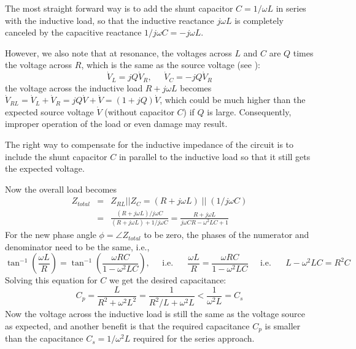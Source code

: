 The most straight forward way is to add the shunt capacitor 
$C=1/\omega L$ in series with the inductive load, so that the 
inductive reactance $j\omega L$ is completely canceled by the 
capacitive reactance $1/j\omega C=-j\omega L$.


However, we also note that at resonance, the voltages across $L$ and 
$C$ are $Q$ times the voltage across $R$, which is the same as the 
source voltage (see ):
\[
\dot{V}_L=jQ\dot{V}_R,\;\;\;\;\;\dot{V}_C=-jQ\dot{V}_R
\]
the voltage across the inductive load $R+j\omega L$ becomes 
$\dot{V}_{RL}=\dot{V}_L+\dot{V}_R=jQ\dot{V}+\dot{V}=(1+jQ)\dot{V}$, 
which could be much higher than the expected source voltage $\dot{V}$ 
(without capacitor $C$) if $Q$ is large. Consequently, improper 
operation of the load or even damage may result.

The right way to compensate for the inductive impedance of the circuit
is to include the shunt capacitor $C$ in parallel to the inductive load 
so that it still gets the expected voltage.


Now the overall load becomes 
\begin{eqnarray}
  Z_{total}&=&Z_{RL}||Z_C=(R+j\omega L)\; || \;(1/j\omega C)
  \nonumber\\
  &=&\frac{(R+j\omega L)/j\omega C}{(R+j\omega L)+1/j\omega C}
  =\frac{R+j\omega L}{j\omega CR-\omega^2 LC+1}	
  \nonumber
\end{eqnarray}
For the new phase angle $\phi=\angle Z_{total}$ to be zero, the phases 
of the numerator and denominator need to be the same, i.e.,
\[
\tan^{-1}\left(\frac{\omega L}{R}\right)
=\tan^{-1}\left(\frac{\omega RC}{1-\omega^2 LC}\right),
\;\;\;\;\;\mbox{i.e.}\;\;\;\;\;\;
\frac{\omega L}{R}=\frac{\omega RC}{1-\omega^2 LC}	
\;\;\;\;\;\mbox{i.e.}\;\;\;\;\;\;
L-\omega^2 LC=R^2C
\]
Solving this equation for $C$ we get the desired capacitance:
\[
C_p=\frac{L}{R^2+\omega^2 L^2} =\frac{1}{R^2/L+\omega^2 L}<\frac{1}{\omega^2L}
=C_s
\]
Now the voltage across the inductive load is still the same as the voltage
source as expected, and another benefit is that the required capacitance $C_p$
is smaller than the capacitance $C_s=1/\omega^2 L$ required for the series 
approach.


